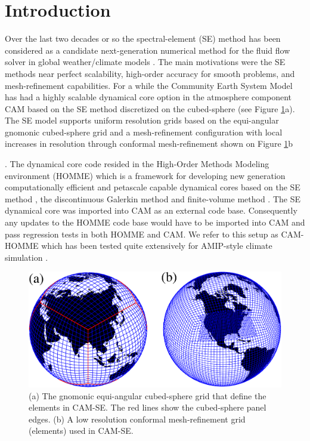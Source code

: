 \documentclass{agujournal}
\begin{document}
\section{Introduction}
Over the last two decades or so the spectral-element (SE) method has been considered as a candidate next-generation numerical method for the fluid flow solver in  global weather/climate models \citep{FT2004MWR,BWTF2006MWR,KG2012JCP,GKC2013SIAM} {\color{red}{other references needed?}}. The main motivations were the SE methods near perfect scalability, high-order accuracy for smooth problems, and mesh-refinement capabilities. For a while the Community Earth System Model \citep[CESM; ][]{CESM1} has had a highly scalable dynamical core option in the atmosphere component CAM \citep[Community Atmosphere Model; ][]{CAM5} based on the SE method discretized on the cubed-sphere (see Figure \ref{fig:grids}a). The SE model supports uniform resolution grids based on the equi-angular gnomonic cubed-sphere grid and a mesh-refinement configuration with local increases in resolution through conformal mesh-refinement shown on Figure \ref{fig:grids}b {\citep{FT2004MWR,BWTF2006MWR,ZJT2013,ZetAl2014JCb}. The dynamical core code resided in the High-Order Methods Modeling environment (HOMME) which is a framework for developing new generation computationally efficient and petascale capable dynamical cores based on the SE method \citep{TL2000JSC,TES2008JPCS}, the discontinuous Galerkin method \citep{NCT2009CF} and finite-volume method \citep{ELGT2012PCS,LTOUNGK2017MWR}. The SE dynamical core was imported into CAM as an external code base. Consequently any updates to the HOMME code base would have to be imported into CAM and pass regression tests in both HOMME and CAM. We refer to this setup as CAM-HOMME which has been tested quite extensively for AMIP-style climate simulation \citep{ELMNTT2012JC,BetAl2013JC,RetAl2015GRL}.
  \begin{figure}[h]
\centering
 \includegraphics[scale=0.45]{figs/grids}
 \caption{(a) The gnomonic equi-angular cubed-sphere grid that define the elements in CAM-SE. The red lines show the cubed-sphere panel edges. (b) A low resolution conformal mesh-refinement grid (elements) used in CAM-SE.}
 \label{fig:grids}
\end{figure}

}
\end{document}
